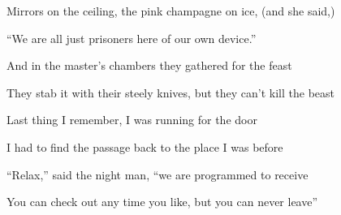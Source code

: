 \zs
Mirrors on the ceiling,
the pink champagne on ice, (and she said,)

``We are all just prisoners here of our own device.''

And in the master's chambers
they gathered for the feast

They stab it with their steely knives,
but they can't kill the beast
\ks

\zs
Last thing I remember,
I was running for the door

I had to find the passage
back to the place I was before

``Relax,'' said the night man,
``we are programmed to receive

You can check out any time you like,
but you can never leave''
\ks

\kp
